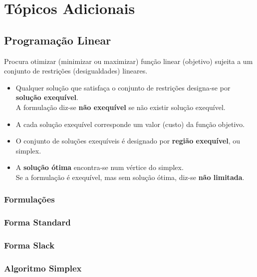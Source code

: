 \documentclass[11pt]{article}
\begin{document}
\newpage

\section{Tópicos Adicionais}

\subsection{Programação Linear} 

Procura otimizar (minimizar ou maximizar) função linear (objetivo) sujeita a um conjunto de restrições (desigualdades) lineares.

\begin{itemize}[topsep=0pt]
    \item Qualquer solução que satisfaça o conjunto de restrições designa-se por \textbf{solução exequível}. \\[4pt]
          A formulação diz-se \textbf{não exequível} se não existir solução exequível.
    \item A cada solução exequível corresponde um valor (custo) da função objetivo.
    \item O conjunto de soluções exequíveis é designado por \textbf{região exequível}, ou simplex.
    \item A \textbf{solução ótima} encontra-se num vértice do simplex. \\[4pt]
          Se a formulação é exequível, mas sem solução ótima, diz-se \textbf{não limitada}.
\end{itemize}

\subsubsection{Formulações}

\subsubsection*{Forma Standard}



\subsubsection*{Forma Slack}



\subsubsection{Algoritmo Simplex}
\end{document}
